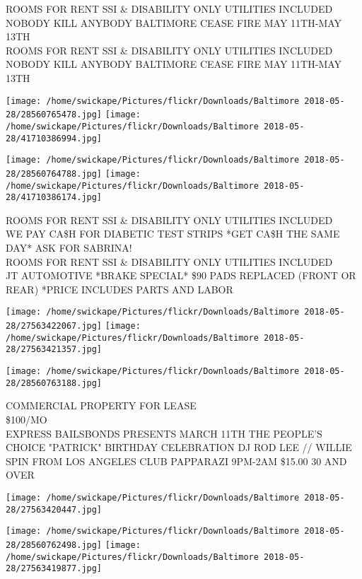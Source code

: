 \documentclass[10pt,letterpaper]{article}
\begin{document}
ROOMS FOR RENT SSI \& DISABILITY ONLY UTILITIES INCLUDED\\
NOBODY KILL ANYBODY BALTIMORE CEASE FIRE MAY 11TH{-}MAY 13TH\\
ROOMS FOR RENT SSI \& DISABILITY ONLY UTILITIES INCLUDED NOBODY KILL ANYBODY BALTIMORE CEASE FIRE MAY 11TH{-}MAY 13TH\\
\pagebreak

\texttt{[image: /home/swickape/Pictures/flickr/Downloads/Baltimore 2018-05-28/28560765478.jpg]}
\texttt{[image: /home/swickape/Pictures/flickr/Downloads/Baltimore 2018-05-28/41710386994.jpg]}

\texttt{[image: /home/swickape/Pictures/flickr/Downloads/Baltimore 2018-05-28/28560764788.jpg]}
\texttt{[image: /home/swickape/Pictures/flickr/Downloads/Baltimore 2018-05-28/41710386174.jpg]}

ROOMS FOR RENT SSI \& DISABILITY ONLY UTILITIES INCLUDED\\
WE PAY CA\$H FOR DIABETIC TEST STRIPS *GET CA\$H THE SAME DAY* ASK FOR SABRINA!\\
ROOMS FOR RENT SSI \& DISABILITY ONLY UTILITIES INCLUDED\\
JT AUTOMOTIVE *BRAKE SPECIAL* \$90 PADS REPLACED (FRONT OR REAR) *PRICE INCLUDES PARTS AND LABOR\\
\pagebreak

\texttt{[image: /home/swickape/Pictures/flickr/Downloads/Baltimore 2018-05-28/27563422067.jpg]}
\texttt{[image: /home/swickape/Pictures/flickr/Downloads/Baltimore 2018-05-28/27563421357.jpg]}

\texttt{[image: /home/swickape/Pictures/flickr/Downloads/Baltimore 2018-05-28/28560763188.jpg]}

COMMERCIAL PROPERTY FOR LEASE\\
\$100/MO\\
EXPRESS BAILSBONDS PRESENTS MARCH 11TH THE PEOPLE'S CHOICE "PATRICK" BIRTHDAY CELEBRATION DJ ROD LEE // WILLIE SPIN FROM LOS ANGELES CLUB PAPPARAZI 9PM{-}2AM \$15.00 30 AND OVER\\
\pagebreak

\texttt{[image: /home/swickape/Pictures/flickr/Downloads/Baltimore 2018-05-28/27563420447.jpg]}

\vspace{0.25in}
\texttt{[image: /home/swickape/Pictures/flickr/Downloads/Baltimore 2018-05-28/28560762498.jpg]}
\texttt{[image: /home/swickape/Pictures/flickr/Downloads/Baltimore 2018-05-28/27563419877.jpg]}
\end{document}
